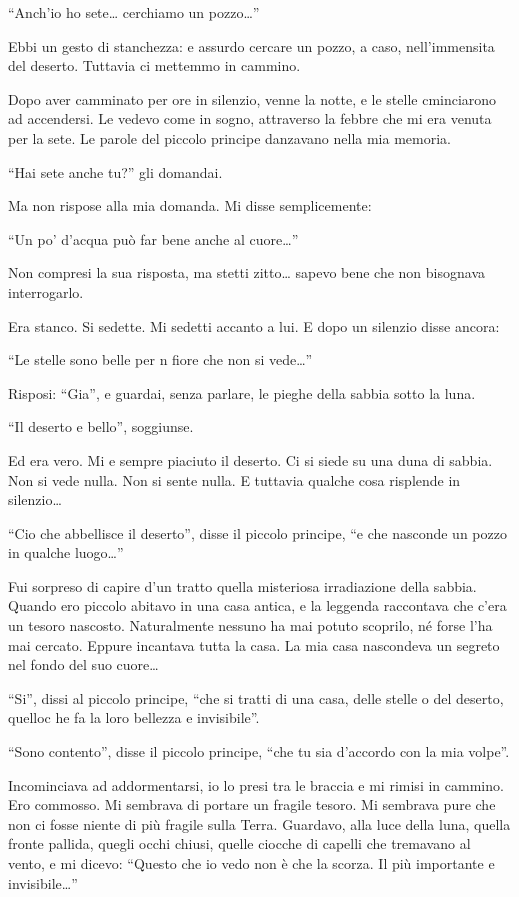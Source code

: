 \documentclass[11pt]{scrbook}
\begin{document}
``Anch'io ho sete\ldots{} cerchiamo un pozzo\ldots{}''

Ebbi un gesto di stanchezza: e assurdo cercare un pozzo, a caso,
nell'immensita del deserto. Tuttavia ci mettemmo in cammino.

Dopo aver camminato per ore in silenzio, venne la notte, e le stelle
cminciarono ad accendersi. Le vedevo come in sogno, attraverso la febbre
che mi era venuta per la sete. Le parole del piccolo principe danzavano
nella mia memoria.

``Hai sete anche tu?'' gli domandai.

Ma non rispose alla mia domanda. Mi disse semplicemente:

``Un po' d'acqua può far bene anche al cuore\ldots{}''

Non compresi la sua risposta, ma stetti zitto\ldots{} sapevo bene che
non bisognava interrogarlo.

Era stanco. Si sedette. Mi sedetti accanto a lui. E dopo un silenzio
disse ancora:

``Le stelle sono belle per n fiore che non si vede\ldots{}''

Risposi: ``Gia'', e guardai, senza parlare, le pieghe della sabbia sotto
la luna.

``Il deserto e bello'', soggiunse.

Ed era vero. Mi e sempre piaciuto il deserto. Ci si siede su una duna di
sabbia. Non si vede nulla. Non si sente nulla. E tuttavia qualche cosa
risplende in silenzio\ldots{}

``Cio che abbellisce il deserto'', disse il piccolo principe, ``e che
nasconde un pozzo in qualche luogo\ldots{}''

Fui sorpreso di capire d'un tratto quella misteriosa irradiazione della
sabbia. Quando ero piccolo abitavo in una casa antica, e la leggenda
raccontava che c'era un tesoro nascosto. Naturalmente nessuno ha mai
potuto scoprilo, né forse l'ha mai cercato. Eppure incantava tutta la
casa. La mia casa nascondeva un segreto nel fondo del suo cuore\ldots{}

``Si'', dissi al piccolo principe, ``che si tratti di una casa, delle
stelle o del deserto, quelloc he fa la loro bellezza e invisibile''.

``Sono contento'', disse il piccolo principe, ``che tu sia d'accordo con
la mia volpe''.

Incominciava ad addormentarsi, io lo presi tra le braccia e mi rimisi in
cammino. Ero commosso. Mi sembrava di portare un fragile tesoro. Mi
sembrava pure che non ci fosse niente di più fragile sulla Terra.
Guardavo, alla luce della luna, quella fronte pallida, quegli occhi
chiusi, quelle ciocche di capelli che tremavano al vento, e mi dicevo:
``Questo che io vedo non è che la scorza. Il più importante e
invisibile\ldots{}''
\end{document}
